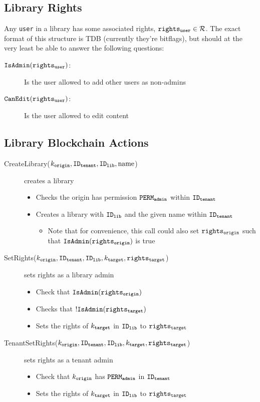 \documentclass{article}
\begin{document}
\subsection{Library Rights}
Any \texttt{user} in a library has some associated rights, $\mathtt{rights_{user}} \in \mathcal{R}$. 
The exact format of this structure is TDB (currently they're bitflags), but should at the very least be able to answer the following questions:

\begin{description}
  \item[$\mathtt{IsAdmin}(\mathtt{rights_{user}})$:] Is the user allowed to add other users as non-admins
  \item[$\mathtt{CanEdit}(\mathtt{rights_{user}})$:]  Is the user allowed to edit content
\end{description}

\subsection{Library Blockchain Actions}

\begin{description}
  \item[CreateLibrary($k_\mathtt{origin}, \mathtt{ID_{tenant}}, \mathtt{ID_{lib}}, \textnormal{name}$)] creates a library
    \begin{itemize}
      \item Checks the origin has permission $\mathtt{PERM_{admin}}$ within $\mathtt{ID_{tenant}}$
      \item Creates a library with $\mathtt{ID_{lib}}$ and the given name within $\mathtt{ID_{tenant}}$
        \begin{itemize}
          \item Note that for convenience, this call could also set $\mathtt{rights_{origin}}$ such that $\mathtt{IsAdmin}(\mathtt{rights_{origin}})$ is true
        \end{itemize}
    \end{itemize}
  \item[SetRights($k_\mathtt{origin}, \mathtt{ID_{tenant}}, \mathtt{ID_{lib}}, k_\mathtt{target}, \mathtt{rights_{target}}$)] sets rights as a library admin
    \begin{itemize}
      \item Check that $\mathtt{IsAdmin}(\mathtt{rights_{origin}})$ 
      \item Checks that $!\mathtt{IsAdmin}(\mathtt{rights_{target}})$
      \item Sets the rights of $k_\mathtt{target}$ in $\mathtt{ID_{lib}}$ to $\mathtt{rights_{target}}$
    \end{itemize}
  \item[TenantSetRights($k_\mathtt{origin}, \mathtt{ID_{tenant}}, \mathtt{ID_{lib}}, k_\mathtt{target}, \mathtt{rights_{target}}$)] sets rights as a tenant admin
    \begin{itemize}
      \item Check that $k_\mathtt{origin}$ has $\mathtt{PERM_{admin}}$ in $\mathtt{ID_{tenant}}$
      \item Sets the rights of $k_\mathtt{target}$ in $\mathtt{ID_{lib}}$ to $\mathtt{rights_{target}}$
    \end{itemize}
\end{description}
\end{document}
